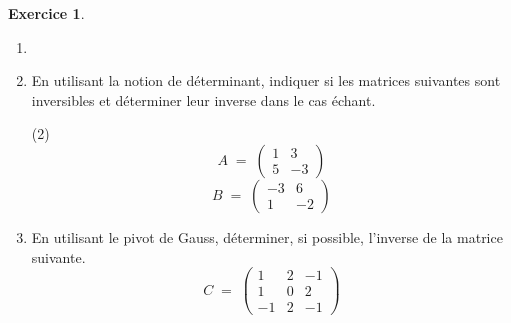 \documentclass{article}
\theoremstyle{definition}
\newtheorem{exercice}{Exercice}
\begin{document}
\begin{exercice}
  \begin{enumerate}
  \item[]
  \item En utilisant la notion de déterminant, indiquer si les matrices suivantes sont inversibles et déterminer leur inverse dans le cas échant.
  \begin{tasks}(2)
    \task[]
      \[
        A \;=\;
        \begin{pmatrix}
          1 & 3\\[6pt]
          5 & -3
        \end{pmatrix}
      \]
    \task[]
      \[
        B \;=\;
        \begin{pmatrix}
          -3 & 6\\[6pt]
          1 & -2
        \end{pmatrix}
      \]
  \end{tasks}
  \item En utilisant le pivot de Gauss, déterminer, si possible, l'inverse de la matrice suivante.
      \[
        C \;=\;
        \begin{pmatrix}
          1 & 2 & -1\\[6pt]
          1 & 0 & 2\\[6pt]
          -1 & 2 & -1
        \end{pmatrix}
      \]
  \end{enumerate}
\end{exercice}
\end{document}
